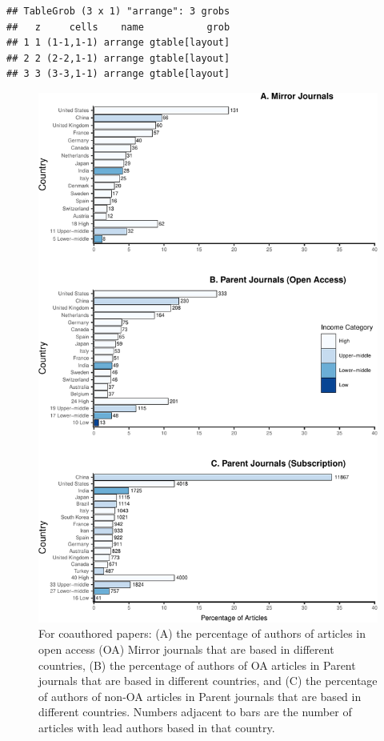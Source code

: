 \documentclass[
  english,
  man]{apa6}
\begin{document}
\begin{verbatim}
## TableGrob (3 x 1) "arrange": 3 grobs
##   z     cells    name           grob
## 1 1 (1-1,1-1) arrange gtable[layout]
## 2 2 (2-2,1-1) arrange gtable[layout]
## 3 3 (3-3,1-1) arrange gtable[layout]
\end{verbatim}

\begin{figure}

{\centering \includegraphics{Smith_etal_APC_ms_files/figure-latex/Fig2-1} 

}

\caption{For coauthored papers: (A) the percentage of authors of articles in open access (OA) Mirror journals that are based in different countries, (B) the percentage of authors of OA articles in Parent journals that are based in different countries, and (C) the percentage of authors of non-OA articles in Parent journals that are based in different countries. Numbers adjacent to bars are the number of articles with lead authors based in that country.}\label{fig:Fig2}
\end{figure}
\end{document}
